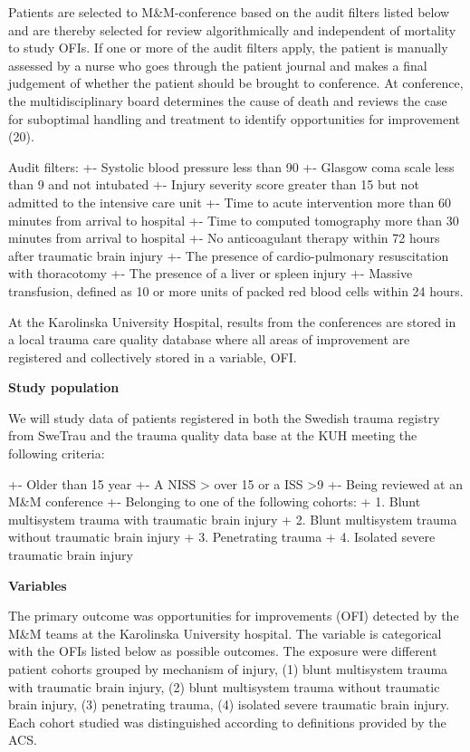 \documentclass[
]{article}
\begin{document}
Patients are selected to M\&M-conference based on the audit filters
listed below and are thereby selected for review algorithmically and
independent of mortality to study OFIs. If one or more of the audit
filters apply, the patient is manually assessed by a nurse who goes
through the patient journal and makes a final judgement of whether the
patient should be brought to conference. At conference, the
multidisciplinary board determines the cause of death and reviews the
case for suboptimal handling and treatment to identify opportunities for
improvement (20).

Audit filters: +- Systolic blood pressure less than 90 +- Glasgow coma
scale less than 9 and not intubated +- Injury severity score greater
than 15 but not admitted to the intensive care unit +- Time to acute
intervention more than 60 minutes from arrival to hospital +- Time to
computed tomography more than 30 minutes from arrival to hospital +- No
anticoagulant therapy within 72 hours after traumatic brain injury +-
The presence of cardio-pulmonary resuscitation with thoracotomy +- The
presence of a liver or spleen injury +- Massive transfusion, defined as
10 or more units of packed red blood cells within 24 hours.

At the Karolinska University Hospital, results from the conferences are
stored in a local trauma care quality database where all areas of
improvement are registered and collectively stored in a variable, OFI.

\textbf{Study population}

We will study data of patients registered in both the Swedish trauma
registry from SweTrau and the trauma quality data base at the KUH
meeting the following criteria:

+- Older than 15 year +- A NISS \textgreater{} over 15 or a ISS
\textgreater9 +- Being reviewed at an M\&M conference +- Belonging to
one of the following cohorts: + 1. Blunt multisystem trauma with
traumatic brain injury + 2. Blunt multisystem trauma without traumatic
brain injury + 3. Penetrating trauma + 4. Isolated severe traumatic
brain injury

\textbf{Variables}

The primary outcome was opportunities for improvements (OFI) detected by
the M\&M teams at the Karolinska University hospital. The variable is
categorical with the OFIs listed below as possible outcomes. The
exposure were different patient cohorts grouped by mechanism of injury,
(1) blunt multisystem trauma with traumatic brain injury, (2) blunt
multisystem trauma without traumatic brain injury, (3) penetrating
trauma, (4) isolated severe traumatic brain injury. Each cohort studied
was distinguished according to definitions provided by the ACS.
\end{document}
